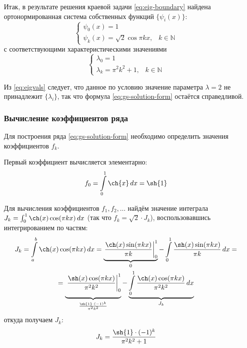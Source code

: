 \documentclass{article}
\numberwithin{equation}{section}
\newcommand{\intl}{\int\limits}
\providecommand{\intat}[3]{\left. {#1}\right\vert^{#2}_{#3}}
\providecommand{\set}[1]{\mathbb{#1}}
\begin{document}
Итак, в результате решения краевой задачи \eqref{eq:eig-boundary}
найдена ортонормированная система собственных функций $\{\psi_i(x)\}$:
\begin{equation}
  \begin{cases}
    \psi_0(x) = 1 \\
    \psi_k(x) = \sqrt{2} \cos{\pi k x}, & k \in \set{N}
  \end{cases}
\end{equation}
с соответствующими характеристическими значениями
\begin{equation}
  \label{eq:eigvals}
  \begin{cases}
    \lambda_0 = 1 \\
    \lambda_k = \pi^2 k^2 + 1, & k \in \set{N}
  \end{cases}
\end{equation}

Из \eqref{eq:eigvals} следует, что данное по условию значение
параметра $\lambda = 2$ не принадлежит $\{\lambda_i\}$, так что
формула \eqref{eq:gs-solution-form} остаётся справедливой.

\subsubsection{Вычисление коэффициентов ряда}

Для построения ряда \eqref{eq:gs-solution-form} необходимо определить
значения коэффициентов $f_k$.

Первый коэффициент вычисляется элементарно:
\begin{equation}
  f_0 = \intl_0^1 \ch{x} \,dx = \sh{1}
\end{equation}

Для вычисления коэффициентов $f_1, f_2, \dotsc$ найдём значение
интеграла $J_k = \int_0^1{\ch(x) \cos(\pi k x)\,dx}$ (так что $f_k =
\sqrt{2}\cdot J_k$), воспользовавшись интегрированием по частям:
\begin{multline*}
  J_k = \intl_a^b{\ch(x) \cos(\pi k x)\,dx} =
  \underbrace{\intat{\frac{\ch(x)\sin(\pi k x)}{\pi k}}{1}{0}}_0 -
  \intl_0^1\frac{\sh(x) \sin(\pi k x)}{\pi k} \,dx = \\ =
  \underbrace{\vphantom{\intl_0^1}\intat{\frac{\sh(x)\cos(\pi k
        x)}{\pi^2 k^2}}{1}{0}}_{\frac{\sh{1}\cdot (-1)^k}{\pi^2 k^2}}
  - \underbrace{\intl_0^1{\frac{\ch(x) \cos(\pi k x)}{\pi^2
        k^2}\,dx}}_{J_k}
\end{multline*}
откуда получаем $J_k$:
\begin{gather*}
  J_k = \frac{\sh{1}\cdot (-1)^k}{\pi^2 k^2 + 1}
\end{gather*}
\end{document}
